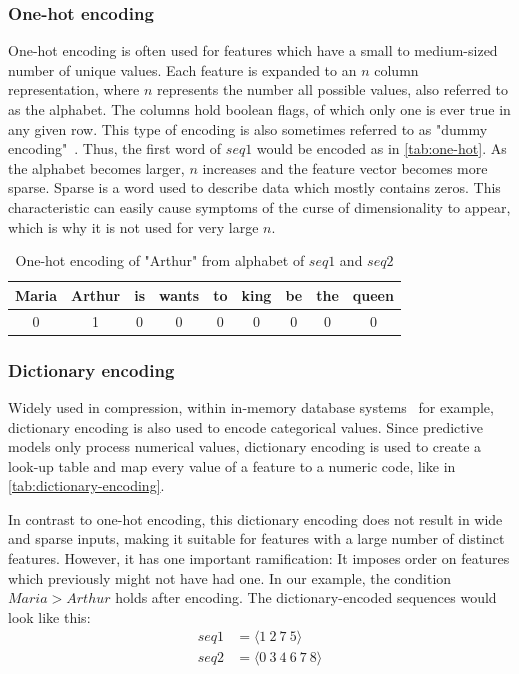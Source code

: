\subsubsection*{One-hot encoding}
One-hot encoding is often used for features which have a small to medium-sized number of unique values. Each feature is expanded to an $n$ column representation, where $n$ represents the number all possible values, also referred to as the alphabet. The columns hold boolean flags, of which only one is ever true in any given row. This type of encoding is also sometimes referred to as "dummy encoding"~\cite{web:pandas-get-dummies}. Thus, the first word of $seq1$ would be encoded as in \autoref{tab:one-hot}. As the alphabet becomes larger, $n$ increases and the feature vector becomes more sparse. Sparse is a word used to describe data which mostly contains zeros. This characteristic can easily cause symptoms of the curse of dimensionality to appear, which is why it is not used for very large $n$.

\begin{table}[ht]
    \centering
    \begin{tabular}{c|c|c|c|c|c|c|c|c}
        Maria & Arthur & is & wants & to & king & be & the & queen\\
        \midrule
        0 & 1 & 0 & 0 & 0 & 0 & 0 & 0 & 0\\
    \end{tabular}
    \caption[One-hot encoding of "Arthur"]{One-hot encoding of "Arthur" from alphabet of $seq1$ and $seq2$}
    \label{tab:one-hot}
\end{table}

\subsubsection*{Dictionary encoding}
Widely used in compression, within in-memory database systems~\cite{plattner2012memory} for example, dictionary encoding is also used to encode categorical values. Since predictive models only process numerical values, dictionary encoding is used to create a look-up table and map every value of a feature to a numeric code, like in \autoref{tab:dictionary-encoding}.

In contrast to one-hot encoding, this dictionary encoding does not result in wide and sparse inputs, making it suitable for features with a large number of distinct features. However, it has one important ramification: It imposes order on features which previously might not have had one. In our example, the condition $Maria > Arthur$ holds after encoding. The dictionary-encoded sequences would look like this:
\begin{equation*}
    \begin{split}
        seq1 &= \langle1\ 2\ 7\ 5\rangle\\
        seq2 &= \langle0\ 3\ 4\ 6\ 7\ 8\rangle
    \end{split}
\end{equation*}

